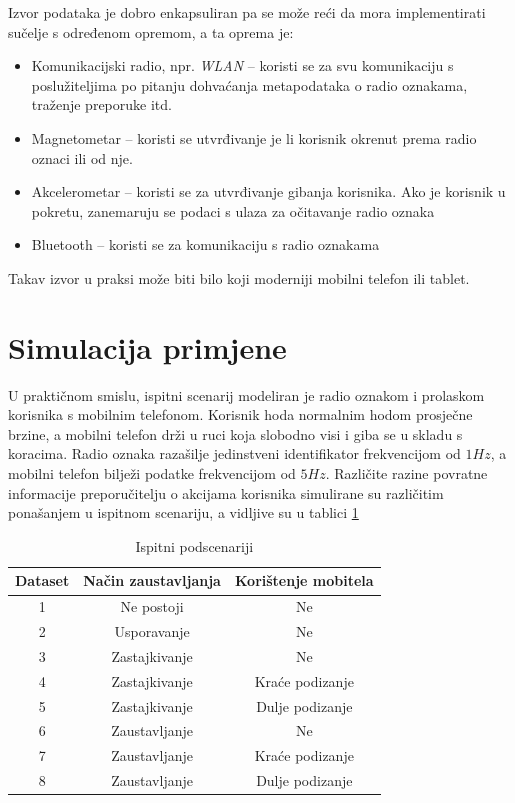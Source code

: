 \documentclass[times, utf8, diplomski, numeric]{fer}
\begin{document}
Izvor podataka je dobro enkapsuliran pa se može reći da mora implementirati
sučelje s određenom opremom, a ta oprema je:
\begin{itemize}
  \item Komunikacijski radio, npr. \emph{WLAN}  -- koristi
  se za svu komunikaciju s poslužiteljima po pitanju dohvaćanja metapodataka o
  radio oznakama, traženje preporuke itd.
  \item Magnetometar -- koristi se utvrđivanje je li korisnik okrenut prema
  radio oznaci ili od nje. %
  \item Akcelerometar -- koristi se za utvrđivanje gibanja korisnika. Ako je
  korisnik u pokretu, zanemaruju se podaci s ulaza za očitavanje radio oznaka
  \item Bluetooth -- koristi se za komunikaciju s radio oznakama
\end{itemize}

Takav izvor u praksi može biti bilo koji moderniji mobilni telefon ili tablet.

\section{Simulacija primjene}
U praktičnom smislu, ispitni scenarij modeliran je radio oznakom i prolaskom
korisnika s mobilnim telefonom. Korisnik hoda normalnim hodom prosječne brzine,
a mobilni telefon drži u ruci koja slobodno visi i giba se u skladu s koracima.
Radio oznaka razašilje jedinstveni identifikator frekvencijom od $1 Hz$, a
mobilni telefon bilježi podatke frekvencijom od $5 Hz$. Različite razine
povratne informacije preporučitelju o akcijama korisnika simulirane su
različitim ponašanjem u ispitnom scenariju, a vidljive su u tablici
\ref{tbl:podscenariji}

\begin{table}[!htb]
	\caption{Ispitni podscenariji}
	\label{tbl:podscenariji}
	\centering
	\begin{tabular}{|c|c|c|} \hline		
		Dataset & Način zaustavljanja & Korištenje mobitela\\ \hline
		1 & Ne postoji & Ne\\
		2 & Usporavanje & Ne\\
		3 & Zastajkivanje & Ne\\
		4 & Zastajkivanje & Kraće podizanje\\
		5 & Zastajkivanje & Dulje podizanje\\
		6 & Zaustavljanje & Ne\\
		7 & Zaustavljanje & Kraće podizanje\\
		8 & Zaustavljanje & Dulje podizanje\\ \hline
	\end{tabular}
\end{table}
\end{document}
